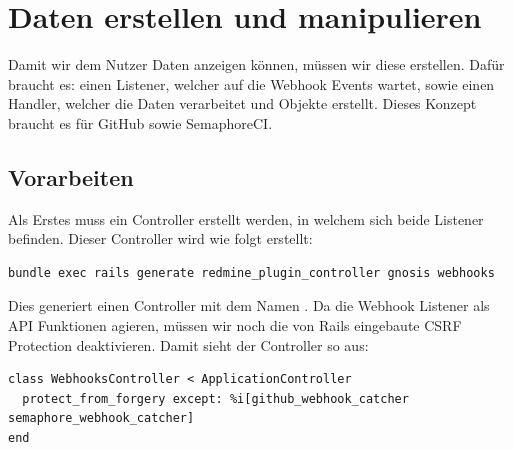 \section{Daten erstellen und manipulieren}
Damit wir dem Nutzer Daten anzeigen können, müssen wir diese erstellen. Dafür braucht es: einen Listener, welcher auf
die Webhook Events wartet, sowie einen Handler, welcher die Daten verarbeitet und Objekte erstellt. \newline
Dieses Konzept braucht es für GitHub sowie SemaphoreCI.

\subsection{Vorarbeiten}
\label{sec:webhook_prework}
Als Erstes muss ein Controller erstellt werden, in welchem sich beide Listener befinden. Dieser Controller wird wie
folgt erstellt:
\begin{codebox}[]
  \begin{verbatim}
bundle exec rails generate redmine_plugin_controller gnosis webhooks
  \end{verbatim}
\end{codebox}

Dies generiert einen Controller mit dem Namen . Da die Webhook Listener als
API Funktionen agieren, müssen wir noch die von Rails eingebaute CSRF Protection deaktivieren. Damit sieht der
Controller so aus:
\begin{codebox}[]
  \begin{verbatim}
class WebhooksController < ApplicationController
  protect_from_forgery except: %i[github_webhook_catcher semaphore_webhook_catcher]
end
  \end{verbatim}
\end{codebox}

